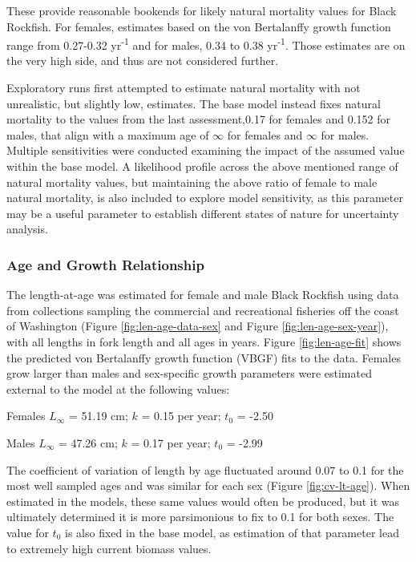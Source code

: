 \documentclass[11pt,
  letterpaper,
]{article}
\begin{document}
These provide reasonable bookends for likely natural mortality values for Black Rockfish. For females, estimates based on the von Bertalanffy growth function range from 0.27-0.32 yr\textsuperscript{-1} and for males, 0.34 to 0.38 yr\textsuperscript{-1}. Those estimates are on the very high side, and thus are not considered further.

Exploratory runs first attempted to estimate natural mortality with not unrealistic, but slightly low, estimates. The base model instead fixes natural mortality to the values from the last assessment,0.17 for females and 0.152 for males, that align with a maximum age of \ensuremath{\infty{}} for females and \ensuremath{\infty{}} for males. Multiple sensitivities were conducted examining the impact of the assumed value within the base model. A likelihood profile across the above mentioned range of natural mortality values, but maintaining the above ratio of female to male natural mortality, is also included to explore model sensitivity, as this parameter may be a useful parameter to establish different states of nature for uncertainty analysis.

\hypertarget{age-and-growth-relationship}{%
\subsubsection{Age and Growth Relationship}\label{age-and-growth-relationship}}

The length-at-age was estimated for female and male Black Rockfish using data from collections sampling the commercial and recreational fisheries off the coast of Washington (Figure \ref{fig:len-age-data-sex} and Figure \ref{fig:len-age-sex-year}), with all lengths in fork length and all ages in years. Figure \ref{fig:len-age-fit} shows the predicted von Bertalanffy growth function (VBGF) fits to the data. Females grow larger than males and sex-specific growth parameters were estimated external to the model at the following values:

\begin{centering}

Females $L_{\infty}$ = 51.19 cm; $k$ = 0.15 per year; $t_0$ = -2.50

Males $L_{\infty}$ = 47.26 cm; $k$ = 0.17 per year; $t_0$ = -2.99

\end{centering}

\vspace{0.5cm}

The coefficient of variation of length by age fluctuated around 0.07 to 0.1 for the most well sampled ages and was similar for each sex (Figure \ref{fig:cv-lt-age}). When estimated in the models, these same values would often be produced, but it was ultimately determined it is more parsimonious to fix to 0.1 for both sexes. The value for \(t_0\) is also fixed in the base model, as estimation of that parameter lead to extremely high current biomass values.
\end{document}
